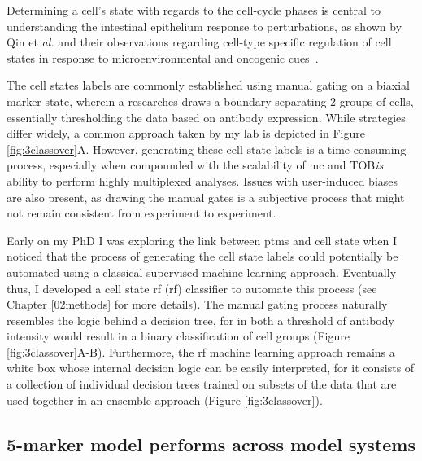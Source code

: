 Determining a cell's state with regards to the cell-cycle phases is central to understanding the intestinal epithelium response to perturbations, as shown by Qin et \emph{al.} and their observations regarding cell-type specific regulation of cell states in response to microenvironmental and oncogenic cues~\cite{qin_cell-type-specific_2020}.

The cell states labels are commonly established using manual gating on a biaxial marker state, wherein a researches draws a boundary separating 2 groups of cells, essentially thresholding the data based on antibody expression. While strategies differ widely, a common approach taken by my lab is depicted in Figure \ref{fig:3classover}A. However, generating these cell state labels is a time consuming process, especially when compounded with the scalability of \acrshort{mc} and TOB\emph{is} ability to perform highly multiplexed analyses. Issues with user-induced biases are also present, as drawing the manual gates is a subjective process that might not remain consistent from experiment to experiment.

Early on my PhD I was exploring the link between \acrshort{ptm}s and cell state when I noticed that the process of generating the cell state labels could potentially be automated using a classical supervised machine learning approach. Eventually thus, I developed a cell state \acrlong{rf} (\acrshort{rf}) classifier to automate this process (see Chapter \ref{02methods} for more details). The manual gating process naturally resembles the logic behind a decision tree, for in both a threshold of antibody intensity would result in a binary classification of cell groups (Figure \ref{fig:3classover}A-B). Furthermore, the \acrshort{rf} machine learning approach remains a white box whose internal decision logic can be easily interpreted, for it consists of a collection of individual decision trees trained on subsets of the data that are used together in an ensemble approach (Figure \ref{fig:3classover}).

\subsection{5-marker model performs across model systems}

